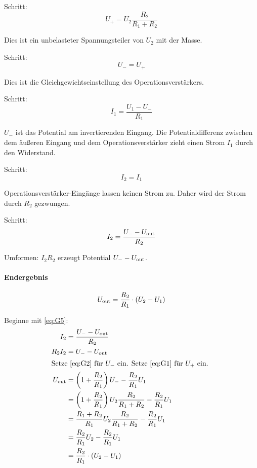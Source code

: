 Schritt:
\begin{equation}
	\label{eq:G1}
	U_+ = U_2 \frac{R_2}{R_1 + R_2}
\end{equation}

Dies ist ein unbelasteter Spannungsteiler von $U_2$ mit der Masse.

Schritt:
\begin{equation}
	\label{eq:G2}
	U_- = U_+
\end{equation}

Dies ist die Gleichgewichtseinstellung des Operationsverstärkers.

Schritt:
\begin{equation}
	\label{eq:G3}
	I_1 = \frac{U_1 - U_-}{R_1}
\end{equation}

$U_-$ ist das Potential am invertierenden Eingang. Die Potentialdifferenz
zwischen dem äußeren Eingang und dem Operationsverstärker zieht einen Strom
$I_1$ durch den Widerstand.

Schritt:
\begin{equation}
	\label{eq:G4}
	I_2 = I_1
\end{equation}

Operationsverstärker-Eingänge lassen keinen Strom zu. Daher wird der Strom
durch $R_2$ gezwungen.

Schritt:
\begin{equation}
	\label{eq:G5}
	I_2 = \frac{U_- - U_\text{out}}{R_2}
\end{equation}

Umformen: $I_2 R_2$ erzeugt Potential $U_- - U_\text{out}$.

\paragraph{Endergebnis}
\[
	U_\text{out} = \frac{R_2}{R_1} \cdot (U_2 - U_1)
\]

Beginne mit \eqref{eq:G5}:
\begin{align*}
	I_2 &= \frac{U_- - \Uout}{R_2} \\
	R_2 I_2 &= U_- - \Uout \\
	\intertext{%
		Setze \eqref{eq:G2} für $U_-$ ein. Setze \eqref{eq:G1} für $U_+$ ein.
	}
	\Uout
	&= \del{1 + \frac{R_2}{R_1}} U_- - \frac{R_2}{R_1} U_1 \\
	&= \del{1 + \frac{R_2}{R_1}} U_2 \frac{R_2}{R_1 + R_2} - \frac{R_2}{R_1} U_1 \\
	&= \frac{R_1 + R_2}{R_1} U_2 \frac{R_2}{R_1 + R_2} - \frac{R_2}{R_1} U_1 \\
	&= \frac{R_2}{R_1} U_2 - \frac{R_2}{R_1} U_1 \\
	&= \frac{R_2}{R_1} \cdot (U_2 - U_1)
\end{align*}

